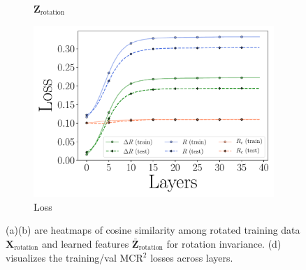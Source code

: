 \documentclass[../../book-main.tex]{subfiles}
\begin{document}
\begin{example}
\begin{figure}[t]
\begin{subfigure}[t]{0.3\textwidth}
        \caption{$\bm{Z}_{\text{rotation}}$}
    \end{subfigure}
    \hfill
    \begin{subfigure}[t]{0.32\textwidth}
        \centering
        \includegraphics[width=\textwidth]{figs_chap4/mnist1d-loss-traintest.pdf}
        \caption{Loss}
    \end{subfigure}
    \caption{\small (a)(b) are heatmaps of cosine similarity among rotated training data $\bm{X}_{\text{rotation}}$ and learned features $\bar{\bm{Z}}_{\text{rotation}}$ for rotation invariance. (d) visualizes the training/val MCR$^2$ losses across layers.}
    \label{fig:redu-invariant-1d-mnist-diagram}
\end{figure}

\end{example}
\end{document}
